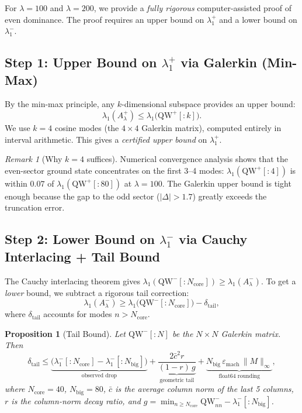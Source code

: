 \documentclass[12pt,a4paper]{article}
\newtheorem{proposition}[theorem]{Proposition}
\theoremstyle{definition}
\theoremstyle{remark}
\newtheorem{remark}[theorem]{Remark}
\begin{document}
For $\lambda = 100$ and $\lambda = 200$, we provide a \emph{fully rigorous} computer-assisted proof of even dominance. The proof requires an upper bound on $\lambda_1^+$ and a lower bound on $\lambda_1^-$.

\subsection{Step 1: Upper Bound on $\lambda_1^+$ via Galerkin (Min-Max)}

By the min-max principle, any $k$-dimensional subspace provides an upper bound:
\begin{equation}
\label{eq:galerkin-upper}
\lambda_1(A_\lambda^+) \leq \lambda_1\bigl(\mathrm{QW}^+[{:}k]\bigr).
\end{equation}
We use $k = 4$ cosine modes (the $4 \times 4$ Galerkin matrix), computed entirely in interval arithmetic. This gives a \emph{certified upper bound} on $\lambda_1^+$.

\begin{remark}[Why $k=4$ suffices]
Numerical convergence analysis shows that the even-sector ground state concentrates on the first 3--4 modes: $\lambda_1(\mathrm{QW}^+[{:}4])$ is within $0.07$ of $\lambda_1(\mathrm{QW}^+[{:}80])$ at $\lambda = 100$. The Galerkin upper bound is tight enough because the gap to the odd sector ($|\Delta| > 1.7$) greatly exceeds the truncation error.
\end{remark}

\subsection{Step 2: Lower Bound on $\lambda_1^-$ via Cauchy Interlacing + Tail Bound}

The Cauchy interlacing theorem gives $\lambda_1(\mathrm{QW}^-[{:}N_{\mathrm{core}}]) \geq \lambda_1(A_\lambda^-)$. To get a \emph{lower} bound, we subtract a rigorous tail correction:
\begin{equation}
\label{eq:tail-bound}
\lambda_1(A_\lambda^-) \geq \lambda_1\bigl(\mathrm{QW}^-[{:}N_{\mathrm{core}}]\bigr) - \delta_{\mathrm{tail}},
\end{equation}
where $\delta_{\mathrm{tail}}$ accounts for modes $n > N_{\mathrm{core}}$.

\begin{proposition}[Tail Bound]
\label{prop:tail}
Let $\mathrm{QW}^-[{:}N]$ be the $N \times N$ Galerkin matrix. Then
\[
\delta_{\mathrm{tail}} \leq \underbrace{\bigl(\lambda_1^-[{:}N_{\mathrm{core}}] - \lambda_1^-[{:}N_{\mathrm{big}}]\bigr)}_{\text{observed drop}} + \underbrace{\frac{2\bar{c}^2 r}{(1-r)\,g}}_{\text{geometric tail}} + \underbrace{N_{\mathrm{big}}\,\varepsilon_{\mathrm{mach}}\,\|M\|_\infty}_{\text{float64 rounding}},
\]
where $N_{\mathrm{core}} = 40$, $N_{\mathrm{big}} = 80$, $\bar{c}$ is the average column norm of the last 5 columns, $r$ is the column-norm decay ratio, and $g = \min_{n \geq N_{\mathrm{core}}} \mathrm{QW}^-_{nn} - \lambda_1^-[{:}N_{\mathrm{big}}]$.
\end{proposition}
\end{document}
